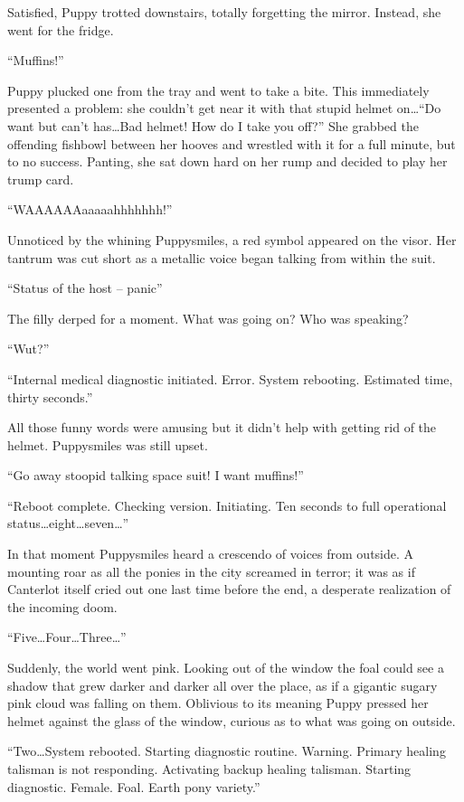 Satisfied, Puppy trotted downstairs, totally forgetting the mirror. Instead, she went for the fridge.

``Muffins!''

Puppy plucked one from the tray and went to take a bite. This immediately presented a problem: she couldn't get near it with that stupid helmet on\dots ``Do want but can't has\dots Bad helmet! How do I take you off?'' She grabbed the offending fishbowl between her hooves and wrestled with it for a full minute, but to no success. Panting, she sat down hard on her rump and decided to play her trump card.

``WAAAAAAaaaaahhhhhhh!''

Unnoticed by the whining Puppysmiles, a red symbol appeared on the visor. Her tantrum was cut short as a metallic voice began talking from within the suit.

``{\mt Status of the host -- panic}''

The filly derped for a moment. What was going on? Who was speaking?

``Wut?''

``{\mt Internal medical diagnostic initiated. Error. System rebooting. Estimated time, thirty seconds.}''

All those funny words were amusing but it didn't help with getting rid of the helmet. Puppysmiles was still upset.

``Go away stoopid talking space suit! I want muffins!''

``{\mt Reboot complete. Checking version. Initiating. Ten seconds to full operational status\dots eight\dots seven\dots}''

In that moment Puppysmiles heard a crescendo of voices from outside. A mounting roar as all the ponies in the city screamed in terror; it was as if Canterlot itself cried out one last time before the end, a desperate realization of the incoming doom.

``{\mt Five\dots Four\dots Three\dots}''

Suddenly, the world went pink. Looking out of the window the foal could see a shadow that grew darker and darker all over the place, as if a gigantic sugary pink cloud was falling on them. Oblivious to its meaning Puppy pressed her helmet against the glass of the window, curious as to what was going on outside.

``{\mt Two\dots System rebooted. Starting diagnostic routine. Warning. Primary healing talisman is not responding. Activating backup healing talisman. Starting diagnostic. Female. Foal. Earth pony variety.}''

